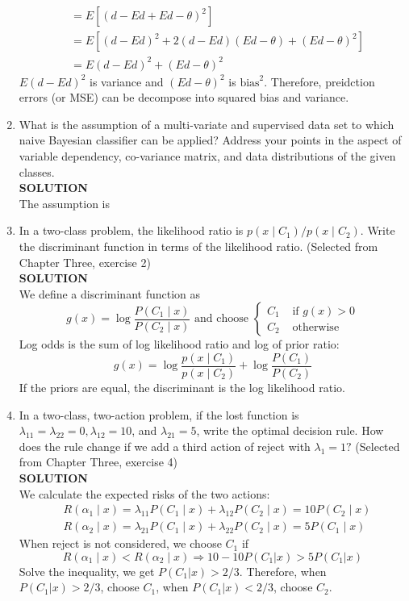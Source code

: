 \documentclass{article}
\begin{document}
\begin{enumerate}
$$\begin{aligned}
        &= E\left[(d-Ed+Ed-\theta)^2\right]\\
        &= E\left[(d-Ed)^2 + 2(d-Ed)(Ed-\theta)+(Ed-\theta)^2\right]\\
        &= E(d-Ed)^2 + (Ed-\theta)^2
    \end{aligned}
    $$
    $E(d-Ed)^2$ is variance and $(Ed-\theta)^2$ is $\text{bias}^2$. Therefore, preidction errors (or MSE) can be decompose into squared bias and variance.
    \item What is the assumption of a multi-variate and supervised data set to which naive Bayesian classifier can be applied? Address your points in the aspect of variable dependency, co-variance matrix, and data distributions of the given classes.\\
    \textbf{SOLUTION}\\
    The assumption is 
    \item In a two-class problem, the likelihood ratio is $p\left(x \mid C_1\right)/p\left(x \mid C_2\right)$. Write the discriminant function in terms of the likelihood ratio. (Selected from Chapter Three, exercise 2)\\
    \textbf{SOLUTION}\\
We define a discriminant function as
$$
g(x)=\log \frac{P\left(C_1 \mid x\right)}{P\left(C_2 \mid x\right)} \text { and choose } \begin{cases}C_1 & \text { if } g(x)>0 \\ C_2 & \text { otherwise }\end{cases}
$$
Log odds is the sum of log likelihood ratio and log of prior ratio:
$$
g(x)=\log \frac{p\left(x \mid C_1\right)}{p\left(x \mid C_2\right)}+\log \frac{P\left(C_1\right)}{P\left(C_2\right)}
$$
If the priors are equal, the discriminant is the log likelihood ratio.
    \item In a two-class, two-action problem, if the lost function is $\lambda_{11}=\lambda_{22}=0, \lambda_{12}=10$, and $\lambda_{21}=5$, write the optimal decision rule. How does the rule change if we add a third action of reject with $\lambda_1=1 ?$ (Selected from Chapter Three, exercise 4)\\
    \textbf{SOLUTION}\\
We calculate the expected risks of the two actions:
$$
\begin{aligned}
&R\left(\alpha_1 \mid x\right)=\lambda_{11} P\left(C_1 \mid x\right)+\lambda_{12} P\left(C_2 \mid x\right)=10 P\left(C_2 \mid x\right) \\
&R\left(\alpha_2 \mid x\right)=\lambda_{21} P\left(C_1 \mid x\right)+\lambda_{22} P\left(C_2 \mid x\right)=5P\left(C_1 \mid x\right)
\end{aligned}
$$
When reject is not considered, we choose $C_1$ if 
$$
R\left(\alpha_1 \mid x\right)<R\left(\alpha_2 \mid x\right) \Rightarrow 10-10P\left(C_1|x\right)>5P\left(C_1|x\right)
$$
Solve the inequality, we get $P(C_1|x)>2/3$. Therefore,  when $P(C_1|x)>2/3$, choose $C_1$, when $P(C_1|x)<2/3$, choose $C_2$.


\end{enumerate}
\end{document}
